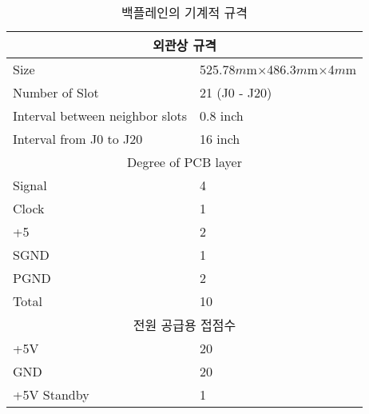 %
%
\begin{table}[htbp]
\caption{백플레인의 기계적 규격}\label{table:backplane-spec}
   \begin{center}
   \begin{tabular}{|l l|} \hline
	\multicolumn{2}{|c|}{외관상 규격} \\ \hline
	Size & 525.78$m$m$\times$486.3$m$m$\times$4$m$m \\
	Number of Slot & 21 (J0 - J20) \\
	Interval between neighbor slots & 0.8 inch \\
	Interval from J0 to J20 & 16 inch \\ \hline
	\multicolumn{2}{|c|}{Degree of PCB layer} \\ \hline
	Signal & 4 \\
	Clock & 1 \\
	+5 & 2 \\
	SGND & 1 \\
	PGND & 2 \\
	Total & 10 \\ \hline
	\multicolumn{2}{|c|}{전원 공급용 접점수} \\ \hline
	+5V & 20 \\
	GND & 20 \\
	+5V Standby & 1 \\ \hline
   \end{tabular}
   \end{center}
\end{table}
%
%
